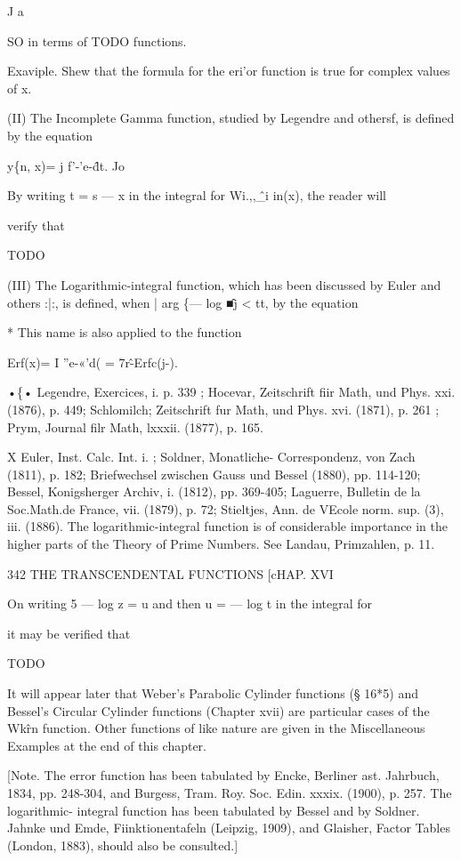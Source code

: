J a

SO in terms of TODO functions.

Exaviple. Shew that the formula for the eri'or function is true for
complex values of x.

(II) The Incomplete Gamma function, studied by Legendre and othersf,
is defined by the equation

y\{n, x)= j f'-'e-\^dt. Jo

By writing t = s — x in the integral for Wi.,,\^\_i in(x), the reader
will

verify that

TODO

(III) The Logarithmic-integral function, which has been discussed by
Euler and others :|:, is defined, when | arg \{— log \^■j < tt, by the
equation

* This name is also applied to the function

Erf(x)= I ''e-«'d( = 7r\^-Erfc(j-).

•\{• Legendre, Exercices, i. p. 339 ; Hocevar, Zeitschrift fiir Math,
und Phys. xxi. (1876), p. 449; Schlomilch; Zeitschrift fur Math, und
Phys. xvi. (1871), p. 261 ; Prym, Journal filr Math, lxxxii. (1877),
p. 165.

X Euler, Inst. Calc. Int. i. ; Soldner, Monatliche- Correspondenz, von
Zach (1811), p. 182; Briefwechsel zwischen Gauss und Bessel (1880),
pp. 114-120; Bessel, Konigsherger Archiv, i. (1812), pp. 369-405;
Laguerre, Bulletin de la Soc.Math.de France, vii. (1879), p. 72;
Stieltjes, Ann. de VEcole norm. sup. (3), iii. (1886). The
logarithmic-integral function is of considerable importance in the
higher parts of the Theory of Prime Numbers. See Landau, Primzahlen,
p. 11.

342 THE TRANSCENDENTAL FUNCTIONS [cHAP. XVI

On writing 5 — log z = u and then u = — log t in the integral for

it may be verified that

TODO

It will appear later that Weber's Parabolic Cylinder functions (§
16*5) and Bessel's Circular Cylinder functions (Chapter xvii) are
particular cases of the Wk\^rn function. Other functions of like
nature are given in the Miscellaneous Examples at the end of this
chapter.

[Note. The error function has been tabulated by Encke, Berliner ast.
Jahrbuch, 1834, pp. 248-304, and Burgess, Tram. Roy. Soc. Edin. xxxix.
(1900), p. 257. The logarithmic- integral function has been tabulated
by Bessel and by Soldner. Jahnke und Emde, Fiinktionentafeln (Leipzig,
1909), and Glaisher, Factor Tables (London, 1883), should also be
consulted.]

